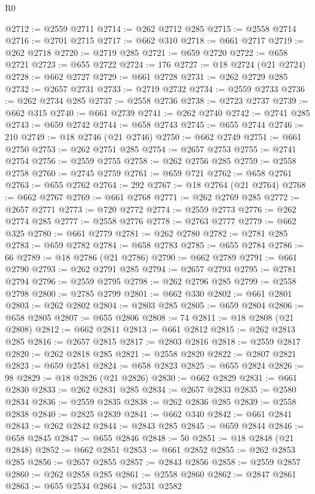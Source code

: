 \begin{lexlean}{R0}
\begin{coremodule}
@2712 := @2559 @2711
@2714 := @262 @2712 @285
@2715 := @2558 @2714
@2716 := @2701 @2715
@2717 := @662 @310
@2718 := @661 @2717
@2719 := @262 @2718
@2720 := @2719 @285
@2721 := @659 @2720
@2722 := @658 @2721
@2723 := @655 @2722
@2724 := 176
@2727 := @18 @2724 (@21 @2724)
@2728 := @662 @2727
@2729 := @661 @2728
@2731 := @262 @2729 @285
@2732 := @2657 @2731
@2733 := @2719 @2732
@2734 := @2559 @2733
@2736 := @262 @2734 @285
@2737 := @2558 @2736
@2738 := @2723 @2737
@2739 := @662 @315
@2740 := @661 @2739
@2741 := @262 @2740
@2742 := @2741 @285
@2743 := @659 @2742
@2744 := @658 @2743
@2745 := @655 @2744
@2746 := 210
@2749 := @18 @2746 (@21 @2746)
@2750 := @662 @2749
@2751 := @661 @2750
@2753 := @262 @2751 @285
@2754 := @2657 @2753
@2755 := @2741 @2754
@2756 := @2559 @2755
@2758 := @262 @2756 @285
@2759 := @2558 @2758
@2760 := @2745 @2759
@2761 := @659 @721
@2762 := @658 @2761
@2763 := @655 @2762
@2764 := 292
@2767 := @18 @2764 (@21 @2764)
@2768 := @662 @2767
@2769 := @661 @2768
@2771 := @262 @2769 @285
@2772 := @2657 @2771
@2773 := @720 @2772
@2774 := @2559 @2773
@2776 := @262 @2774 @285
@2777 := @2558 @2776
@2778 := @2763 @2777
@2779 := @662 @325
@2780 := @661 @2779
@2781 := @262 @2780
@2782 := @2781 @285
@2783 := @659 @2782
@2784 := @658 @2783
@2785 := @655 @2784
@2786 := 66
@2789 := @18 @2786 (@21 @2786)
@2790 := @662 @2789
@2791 := @661 @2790
@2793 := @262 @2791 @285
@2794 := @2657 @2793
@2795 := @2781 @2794
@2796 := @2559 @2795
@2798 := @262 @2796 @285
@2799 := @2558 @2798
@2800 := @2785 @2799
@2801 := @662 @330
@2802 := @661 @2801
@2803 := @262 @2802
@2804 := @2803 @285
@2805 := @659 @2804
@2806 := @658 @2805
@2807 := @655 @2806
@2808 := 74
@2811 := @18 @2808 (@21 @2808)
@2812 := @662 @2811
@2813 := @661 @2812
@2815 := @262 @2813 @285
@2816 := @2657 @2815
@2817 := @2803 @2816
@2818 := @2559 @2817
@2820 := @262 @2818 @285
@2821 := @2558 @2820
@2822 := @2807 @2821
@2823 := @659 @2581
@2824 := @658 @2823
@2825 := @655 @2824
@2826 := 98
@2829 := @18 @2826 (@21 @2826)
@2830 := @662 @2829
@2831 := @661 @2830
@2833 := @262 @2831 @285
@2834 := @2657 @2833
@2835 := @2580 @2834
@2836 := @2559 @2835
@2838 := @262 @2836 @285
@2839 := @2558 @2838
@2840 := @2825 @2839
@2841 := @662 @340
@2842 := @661 @2841
@2843 := @262 @2842
@2844 := @2843 @285
@2845 := @659 @2844
@2846 := @658 @2845
@2847 := @655 @2846
@2848 := 50
@2851 := @18 @2848 (@21 @2848)
@2852 := @662 @2851
@2853 := @661 @2852
@2855 := @262 @2853 @285
@2856 := @2657 @2855
@2857 := @2843 @2856
@2858 := @2559 @2857
@2860 := @262 @2858 @285
@2861 := @2558 @2860
@2862 := @2847 @2861
@2863 := @655 @2534
@2864 := @2531 @2582

\end{coremodule}
\end{lexlean}
